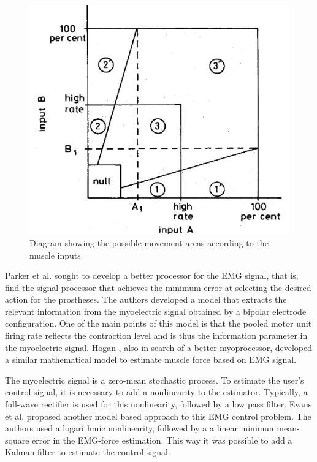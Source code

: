     \begin{figure}[thpb]
      \centering
      \includegraphics[scale=0.5]{Images/Movement_Area_-_Philipson.jpg}
      \caption{Diagram showing the possible movement areas according to the muscle inputs \cite{Philipson1985}}
      \label{Movement space}
   \end{figure}
   
   Parker et al. \cite{Parker1977662} sought to develop a better processor for the EMG signal, that is, find the signal processor that achieves the minimum error at selecting the desired action for the prostheses. The authors developed a model that extracts the relevant information from the myoelectric signal obtained by a bipolar electrode configuration. One of the main points of this model is that the pooled motor unit firing rate reflects the contraction level and is thus the information parameter in the myoelectric signal. Hogan \cite{4123279,4123280}, also in search of a better myoprocessor, developed a similar mathematical model to estimate muscle force based on EMG signal. 
    
    The myoelectric signal is a zero-mean stochastic process. To estimate the user's control signal, it is necessary to add a nonlinearity to the estimator. Typically, a full-wave rectifier is used for this nonlinearity, followed by a low pass filter. Evans et al. \cite{4121805} proposed another model based approach to this EMG control problem. The authors used a logarithmic nonlinearity, followed by a a linear minimun mean-square error in the EMG-force estimation. This way it was possible to add a Kalman filter to estimate the control signal. 
    
